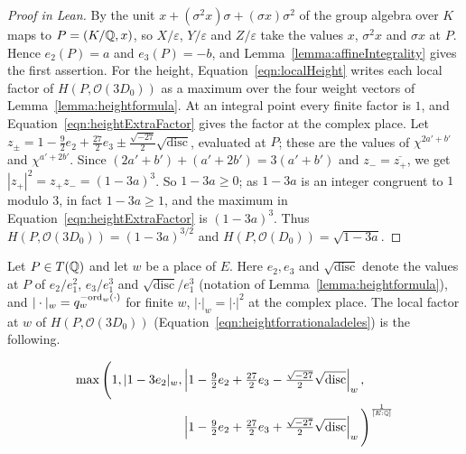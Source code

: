 \begin{proof}[Proof in Lean]

\leanok


By \cite[Prop.~2.5]{odesky2023moduli} the unit $x+(\sigma^2x)\sigma+(\sigma x)\sigma^2$ of the group algebra over $K$ maps to $P=(K/\mathbb{Q},x)$, so $X/\varepsilon$, $Y/\varepsilon$ and $Z/\varepsilon$ take the values $x$, $\sigma^2x$ and $\sigma x$ at $P$. Hence $e_2(P)=a$ and $e_3(P)=-b$, and Lemma~\ref{lemma:affineIntegrality} gives the first assertion. For the height, Equation~\ref{eqn:localHeight} writes each local factor of $H(P,\mathcal O(3D_0))$ as a maximum over the four weight vectors of Lemma~\ref{lemma:heightformula}. At an integral point every finite factor is $1$, and Equation~\ref{eqn:heightExtraFactor} gives the factor at the complex place. Let $z_\pm=1-\tfrac92e_2+\tfrac{27}2e_3\pm\tfrac{\sqrt{-27}}2\sqrt{\mathrm{disc}}$, evaluated at $P$; these are the values of $\chi^{2a'+b'}$ and $\chi^{a'+2b'}$. Since $(2a'+b')+(a'+2b')=3(a'+b')$ and $z_-=\overline{z_+}$, we get $|z_+|^2=z_+z_-=(1-3a)^3$. So $1-3a\geq0$; as $1-3a$ is an integer congruent to $1$ modulo $3$, in fact $1-3a\geq1$, and the maximum in Equation~\ref{eqn:heightExtraFactor} is $(1-3a)^3$. Thus $H(P,\mathcal O(3D_0))=(1-3a)^{3/2}$ and $H(P,\mathcal O(D_0))=\sqrt{1-3a}$.

\end{proof}

\begin{equationnode}

\label{eqn:localHeight}


\leanok

Let $P\in T(\mathbb{Q})$ and let $w$ be a place of $E$. Here $e_2,e_3$ and $\sqrt{\mathrm{disc}}$ denote the values at $P$ of $e_2/e_1^2$, $e_3/e_1^3$ and $\sqrt{\mathrm{disc}}/e_1^3$ (notation of Lemma~\ref{lemma:heightformula}), and $|\cdot|_w=q_w^{-\mathrm{ord}_w(\cdot)}$ for finite $w$, $|\cdot|_w=|\cdot|^2$ at the complex place. The local factor at $w$ of $H(P,\mathcal O(3D_0))$ (Equation~\ref{eqn:heightforrationaladeles}) is the following.

\begin{align*} \max\Bigg( 1, |1-3e_2|_w, &\left| 1-\tfrac{9}{2} e_2+ \tfrac{27}{2} e_3 - \tfrac{\sqrt{-27}}{2} \sqrt{\mathrm{disc}} \right|_w, \\ &\left| 1-\tfrac{9}{2} e_2+ \tfrac{27}{2} e_3 + \tfrac{\sqrt{-27}}{2} \sqrt{\mathrm{disc}} \right|_w \Bigg)^{\frac{1}{[E:\mathbb{Q}]}} \end{align*}

\end{equationnode}

